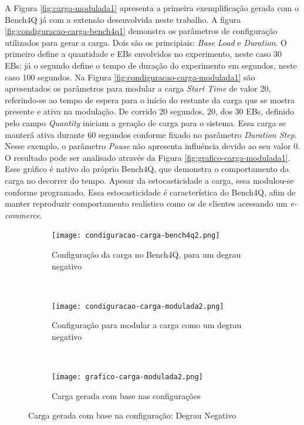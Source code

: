 A Figura \ref{fig:carga-modulada1} apresenta a primeira exemplificação gerada com o Bench4Q já com a extensão desenvolvida neste trabalho. A figura \ref{fig:condiguracao-carga-bench4q1} demonstra os parâmetros de configuração utilizados para gerar a carga. Dois são os principiais: \textit{Base Load} e \textit{Duration}. O primeiro define a quantidade e EBs envolvidos no experimento, neste caso 30 EBs; já o segundo define o tempo de duração do experimento em segundos, neste caso 100 segundos. Na Figura \ref{fig:condiguracao-carga-modulada1} são apresentados os parâmetros para modular a carga \textit{Start Time} de valor 20, referindo-se ao tempo de espera para o início do restante da carga que se mostra presente e ativa na modulação. De corrido 20 segundos, 20, dos 30 EBs, definido pelo campo \textit{Quantity} iniciam a geração de carga para o sistema. Essa carga se manterá ativa durante 60 segundos conforme fixado no parâmetro \textit{Duration Step}. Nesse exemplo, o parâmetro \textit{Pause} não apresenta influência devido ao seu valor 0.
O resultado pode ser analisado através da Figura \ref{fig:grafico-carga-modulada1}. Esse gráfico é nativo do próprio Bench4Q, que demonstra o comportamento da carga no decorrer do tempo. Apesar da estocasticidade a carga, essa modulou-se conforme programado. Essa estocasticidade é característica do Bench4Q, afim de manter reproduzir comportamento realístico como os de clientes acessando um \textit{e-commerce}.

\begin{figure}[!htb]
	\begin{subfigure}{\linewidth}
		\centering
		\texttt{[image: condiguracao-carga-bench4q2.png]}
		\caption{Configuração da carga no Bench4Q, para um degrau negativo}
		\label{fig:condiguracao-carga-bench4q2}
	\end{subfigure}\\
	\begin{subfigure}{\linewidth}
		\centering
		\texttt{[image: condiguracao-carga-modulada2.png]}
		\caption{Configuração para modular a carga como um degrau negativo}
		\label{fig:condiguracao-carga-modulada2}
	\end{subfigure}\\[1ex]
	\begin{subfigure}{\linewidth}
		\centering
		\texttt{[image: grafico-carga-modulada2.png]}
		\caption{Carga gerada com base nas configurações}
		\label{fig:grafico-carga-modulada2}
	\end{subfigure}
	\caption{Carga gerada com base na configuração: Degrau Negativo}
	\label{fig:carga-modulada2}
	\fautor
\end{figure}

